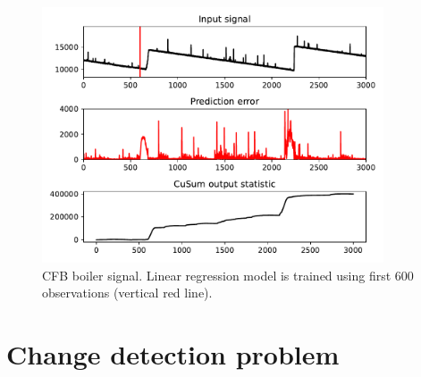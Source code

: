 \begin{figure}[!htb]
	\centering
	\includegraphics[width=0.9\textwidth]{images/boiler_fixed_train}
	\caption{CFB boiler signal.
Linear regression model is trained using first 600 observations (vertical red line).	
}\label{fig:boiler_fixed_train}
\end{figure}

\section{Change detection problem}

